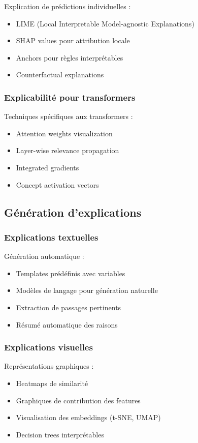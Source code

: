 \documentclass[12pt,a4paper]{report}
\begin{document}
Explication de prédictions individuelles :
\begin{itemize}
\item LIME (Local Interpretable Model-agnostic Explanations)
\item SHAP values pour attribution locale
\item Anchors pour règles interprétables
\item Counterfactual explanations
\end{itemize}

\subsubsection{Explicabilité pour transformers}

Techniques spécifiques aux transformers :
\begin{itemize}
\item Attention weights visualization
\item Layer-wise relevance propagation
\item Integrated gradients
\item Concept activation vectors
\end{itemize}

\subsection{Génération d'explications}

\subsubsection{Explications textuelles}

Génération automatique :
\begin{itemize}
\item Templates prédéfinis avec variables
\item Modèles de langage pour génération naturelle
\item Extraction de passages pertinents
\item Résumé automatique des raisons
\end{itemize}

\subsubsection{Explications visuelles}

Représentations graphiques :
\begin{itemize}
\item Heatmaps de similarité
\item Graphiques de contribution des features
\item Visualisation des embeddings (t-SNE, UMAP)
\item Decision trees interprétables
\end{itemize}
\end{document}
